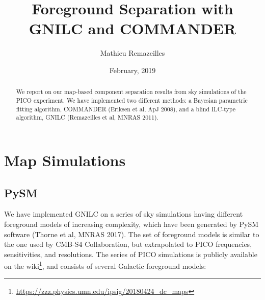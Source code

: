 \documentclass[12pt]{article}
\begin{document}
\title{Foreground Separation with\\ GNILC and COMMANDER}
\author{Mathieu Remazeilles} 
\date{February, 2019} 
\maketitle

\begin{abstract}
\noindent We report on our map-based component separation results from sky simulations of the PICO experiment. We have implemented two different methods: a Bayesian parametric fitting algorithm, COMMANDER (Eriksen et al, ApJ 2008), and a blind ILC-type algorithm, GNILC (Remazeilles et al, MNRAS 2011).

\end{abstract}

\section{Map Simulations}
\label{sec:simulations}

\subsection{PySM}\label{subsec:pysm}

We have implemented GNILC on a series of sky simulations having different foreground models of increasing complexity, which have been generated by PySM software (Thorne et al, MNRAS 2017). The set of foreground models is similar to the one used by CMB-S4 Collaboration, but extrapolated to PICO frequencies, sensitivities, and resolutions. The series of PICO simulations is publicly available on the wiki\footnote{\url{https://zzz.physics.umn.edu/ipsig/20180424_dc_maps}}, and consists of several Galactic foreground models:
\end{document}
